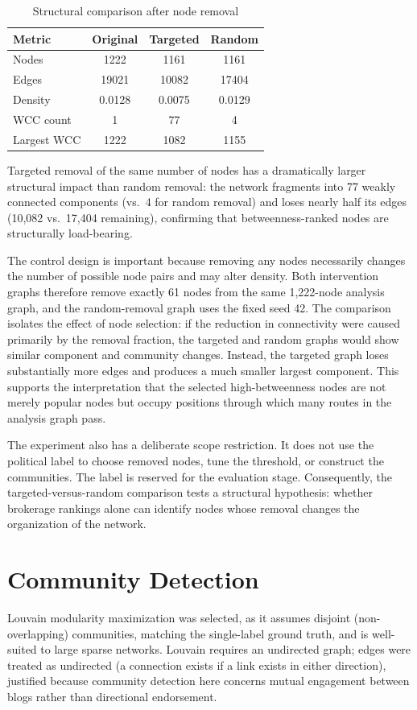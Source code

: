 \documentclass[conference]{IEEEtran}
\begin{document}
\begin{table}[htbp]
\caption{Structural comparison after node removal}
\label{tab:removal}
\centering
\begin{tabular}{@{}lccc@{}}
\toprule
Metric & Original & Targeted & Random \\
\midrule
Nodes & 1222 & 1161 & 1161 \\
Edges & 19021 & 10082 & 17404 \\
Density & 0.0128 & 0.0075 & 0.0129 \\
WCC count & 1 & 77 & 4 \\
Largest WCC & 1222 & 1082 & 1155 \\
\bottomrule
\end{tabular}
\end{table}

Targeted removal of the same number of nodes has a dramatically larger structural impact than random removal: the network fragments into 77 weakly connected components (vs.\ 4 for random removal) and loses nearly half its edges (10,082 vs.\ 17,404 remaining), confirming that betweenness-ranked nodes are structurally load-bearing.

The control design is important because removing any nodes necessarily changes the number of possible node pairs and may alter density. Both intervention graphs therefore remove exactly 61 nodes from the same 1,222-node analysis graph, and the random-removal graph uses the fixed seed 42. The comparison isolates the effect of node selection: if the reduction in connectivity were caused primarily by the removal fraction, the targeted and random graphs would show similar component and community changes. Instead, the targeted graph loses substantially more edges and produces a much smaller largest component. This supports the interpretation that the selected high-betweenness nodes are not merely popular nodes but occupy positions through which many routes in the analysis graph pass.

The experiment also has a deliberate scope restriction. It does not use the political label to choose removed nodes, tune the threshold, or construct the communities. The label is reserved for the evaluation stage. Consequently, the targeted-versus-random comparison tests a structural hypothesis: whether brokerage rankings alone can identify nodes whose removal changes the organization of the network.

\section{Community Detection}
Louvain modularity maximization was selected, as it assumes disjoint (non-overlapping) communities, matching the single-label ground truth, and is well-suited to large sparse networks. Louvain requires an undirected graph; edges were treated as undirected (a connection exists if a link exists in either direction), justified because community detection here concerns mutual engagement between blogs rather than directional endorsement.
\end{document}
